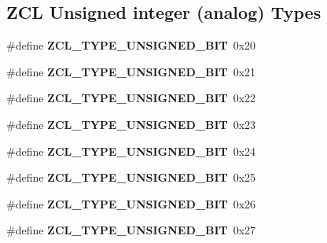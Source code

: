 \subsection*{Z\+CL Unsigned integer (analog) Types}
\begin{DoxyCompactItemize}
\item 
\mbox{\label{group__zcl__types_ga75582ab15d44904f07a44dc8a8e3b717}} 
\#define {\bfseries Z\+C\+L\+\_\+\+T\+Y\+P\+E\+\_\+\+U\+N\+S\+I\+G\+N\+E\+D\+\_\+B\+IT}~0x20
\item 
\mbox{\label{group__zcl__types_ga9045340841bc9478061ce8f87b4840da}} 
\#define {\bfseries Z\+C\+L\+\_\+\+T\+Y\+P\+E\+\_\+\+U\+N\+S\+I\+G\+N\+E\+D\+\_\+B\+IT}~0x21
\item 
\mbox{\label{group__zcl__types_gaec9a6cd5a981c98207fa270670d7d777}} 
\#define {\bfseries Z\+C\+L\+\_\+\+T\+Y\+P\+E\+\_\+\+U\+N\+S\+I\+G\+N\+E\+D\+\_\+B\+IT}~0x22
\item 
\mbox{\label{group__zcl__types_gab04603be22c673ef9c2fc3a2d2fcc837}} 
\#define {\bfseries Z\+C\+L\+\_\+\+T\+Y\+P\+E\+\_\+\+U\+N\+S\+I\+G\+N\+E\+D\+\_\+B\+IT}~0x23
\item 
\mbox{\label{group__zcl__types_gacd1861149c2b59749b5642737adf5195}} 
\#define {\bfseries Z\+C\+L\+\_\+\+T\+Y\+P\+E\+\_\+\+U\+N\+S\+I\+G\+N\+E\+D\+\_\+B\+IT}~0x24
\item 
\mbox{\label{group__zcl__types_gaa7f4db744263603cc5405b69ade288df}} 
\#define {\bfseries Z\+C\+L\+\_\+\+T\+Y\+P\+E\+\_\+\+U\+N\+S\+I\+G\+N\+E\+D\+\_\+B\+IT}~0x25
\item 
\mbox{\label{group__zcl__types_gaad5c0f4102ddb54ecd2c0f740faecd8a}} 
\#define {\bfseries Z\+C\+L\+\_\+\+T\+Y\+P\+E\+\_\+\+U\+N\+S\+I\+G\+N\+E\+D\+\_\+B\+IT}~0x26
\item 
\mbox{\label{group__zcl__types_ga712121c9bf4ad400b2c08ba200538ee8}} 
\#define {\bfseries Z\+C\+L\+\_\+\+T\+Y\+P\+E\+\_\+\+U\+N\+S\+I\+G\+N\+E\+D\+\_\+B\+IT}~0x27
\end{DoxyCompactItemize}
